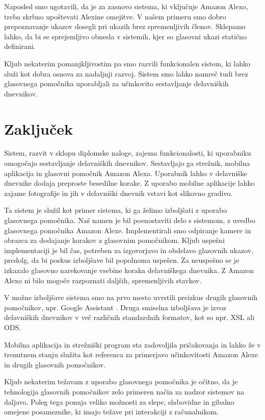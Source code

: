 \documentclass[a4paper, 12pt]{book}
\begin{document}
Naposled smo ugotavili, da je za zasnovo sistema, ki vključuje Amazon Alexo, treba skrbno upoštevati Alexine omejitve.
V našem primeru smo dobro prepoznavanje ukazov dosegli pri ukazih brez spremenljivih členov.
Sklepamo lahko, da bi se sprejemljivo obnesla v sistemih, kjer so glasovni ukazi statično definirani.

Kljub nekaterim pomanjkljivostim pa smo razvili funkcionalen sistem, ki lahko služi kot dobra osnova za nadaljnji razvoj.
Sistem smo lahko namreč tudi brez glasovnega pomočnika uporabljali za učinkovito sestavljanje delavniških dnevnikov.




\chapter{Zaključek}

Sistem, razvit v sklopu diplomske naloge, zajema funkcionalosti, ki uporabniku omogočajo sestavljanje delavniških dnevnikov.
Sestavljajo ga strežnik, mobilna aplikacija in glasovni pomočnik Amazon Alexa.
Uporabnik lahko v delavniške dnevnike dodaja preproste besedilne korake.
Z uporabo mobilne aplikacije lahko zajame fotografije in jih v delavniški dnevnik vstavi kot slikovno gradivo.

Ta sistem je služil kot primer sistema, ki ga želimo izboljšati z uporabo glasovnega pomočnika.
Naš namen je bil poenostaviti delo s sistemom, z uvedbo glasovnega pomočnika Amazon Alexe.
Implementirali smo odpiranje kamere in obrazca za dodajanje korakov z glasovnim pomočnikom.
Kljub uspešni implementaciji je bil čas, potreben za izgovorjavo in obdelavo glasovnih ukazov, predolg, da bi poskus izboljšave bil popolnoma uspešen.
Za neuspešno se je izkazalo glasovno narekovanje vsebine koraka delavniškega dnevnika.
Z Amazon Alexo ni bilo mogoče razpoznati daljših, spremenljivih stavkov.

V možne izboljšave sistema smo na prvo mesto uvrstili preizkus drugih glasovnih pomočnikov, npr. Google Assistant \cite{googleass}.
Druga smiselna izboljšava je izvoz delavniških dnevnikov v več različnih standardnih formatov, kot so npr. XSL ali ODS.

Mobilna aplikacija in strežniški program sta zadovoljila pričakovanja in lahko že v trenutnem stanju služita kot referenca za primerjavo učinkovitosti Amazon Alexe in drugih glasovnih pomočnikov.

Kljub nekaterim težavam z uporabo glasovnega pomočnika je očitno, da je tehnologija glasovnih pomočnikov zelo primeren način za nadzor sistemov na daljavo.
Poleg tega ponuja veliko možnosti za slepe, slabovidne in gibalno omejene posameznike, ki imajo težave pri interakciji z računalnikom.




\newpage %
\ \\
\clearpage
{}

\printbibliography
\end{document}
